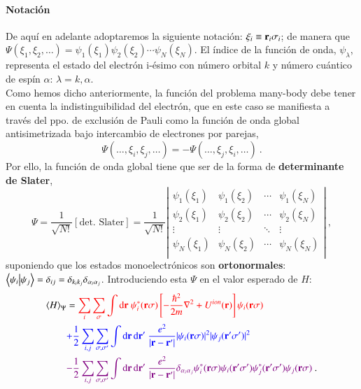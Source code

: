 \paragraph{Notación} De aquí en adelante adoptaremos la siguiente notación: $\xi_i \equiv \mathbf{r}_i \sigma_i$; de manera que $\Psi(\xi_1,\xi_2,\ldots) = \psi_1(\xi_1)\psi_2(\xi_2)\cdots\psi_N(\xi_N)$. El índice de la función de onda, $\psi_\lambda$, representa el estado del electrón i-ésimo con número orbital $k$ y número cuántico de espín $\alpha $: $\lambda = k,\alpha $.\\

Como hemos dicho anteriormente, la función del problema many-body debe tener en cuenta la indistinguibilidad del electrón, que en este caso se manifiesta a través del ppo. de exclusión de Pauli como la función de onda global antisimetrizada bajo intercambio de electrones por parejas,
\begin{equation}
    \Psi (\ldots , \xi_i , \xi_j,\ldots) = -\Psi(\ldots,\xi_j,\xi_i,\ldots)\ .
\end{equation}
Por ello, la función de onda global tiene que ser de la forma de \textbf{determinante de Slater},
\begin{equation}
    \Psi = \frac{1}{\sqrt{N!}} \left [\text{det. Slater} \right ] = \frac{1}{\sqrt{N!}} \left | \begin{array}{cccc}
    \psi_1(\xi_1)     &\psi_1(\xi_2)  &\cdots  &\psi_1(\xi_N)  \\
    \psi_2(\xi_1)     &\psi_2(\xi_2)  &\cdots  &\psi_2(\xi_N)  \\
     \vdots           &\vdots         &\ddots  &\vdots         \\
    \psi_N(\xi_1)     &\psi_N(\xi_2)  &\cdots  &\psi_N(\xi_N)  \\
    \end{array} \right | \ ,
\end{equation}
suponiendo que los estados monoelectrónicos son \textbf{ortonormales}: $\braket{\psi_i}{\psi_j} = \var_{ij} = \var_{k_ik_j} \var_{\alpha_i \alpha_j}$. Introduciendo esta $\Psi$ en el valor esperado de $H$:
\begin{align}
    \expval{H}_\Psi &= \textcolor{red}{\sum_i \sum_\sigma \int \D{\B{r}} \ \psi_i ^*(\B{r}\sigma) \left [  -\frac{\hbar^2 }{2m}\laplacian + U^{ion}(\B{r}) \right ] \psi_i (\B{r} \sigma )} \notag\\
                     & \textcolor{blue}{+\frac{1}{2} \sum_{i,j} \sum_{\sigma ,\sigma'} \int \D{\B{r},\B{r'}}\ \frac{e^2}{|\B{r} - \B{r'}|} |\psi_i (\B{r}\sigma )|^2 |\psi_j (\B{r'}\sigma ')|^2} \notag\\
                     & \textcolor{violet}{-\frac{1}{2} \sum_{i,j} \sum_{\sigma,\sigma'} \int \D{\B{r},\B{r'}} \ \frac{e^2}{|\B{r} - \B{r'}|} \delta_{\alpha_i\alpha_j} \psi_i ^*(\B{r}\sigma )\psi_i(\B{r'}\sigma') \psi^*_j(\B{r'}\sigma') \psi_j (\B{r}\sigma )} \ .
\end{align}
